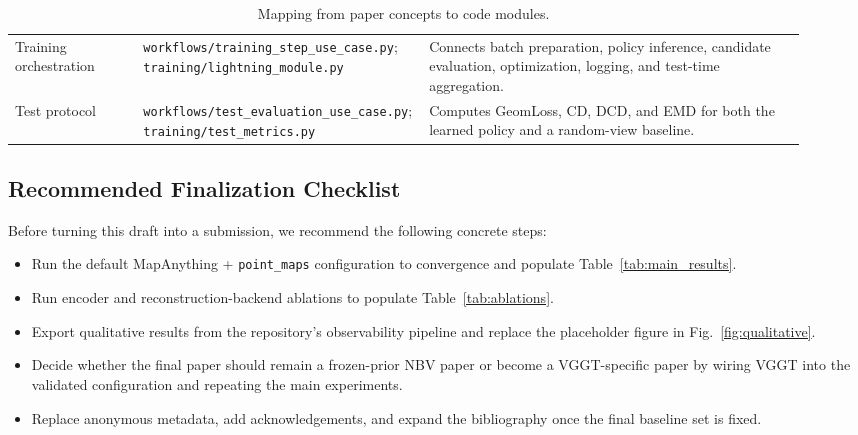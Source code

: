 \begin{table}[h]
\begin{tabular}{>{\raggedright\arraybackslash}p{0.16\linewidth} >{\raggedright\arraybackslash}p{0.29\linewidth} >{\raggedright\arraybackslash}p{0.47\linewidth}}
        Training orchestration & \texttt{workflows/training\_step\_use\_case.py}; \texttt{training/lightning\_module.py} & Connects batch preparation, policy inference, candidate evaluation, optimization, logging, and test-time aggregation. \\
        Test protocol & \texttt{workflows/test\_evaluation\_use\_case.py}; \texttt{training/test\_metrics.py} & Computes GeomLoss, CD, DCD, and EMD for both the learned policy and a random-view baseline. \\
        \bottomrule
    \end{tabular}
    \caption{Mapping from paper concepts to code modules.}
    \label{tab:repo_mapping}
\end{table}

\subsection{Recommended Finalization Checklist}
\label{sec:checklist}

Before turning this draft into a submission, we recommend the following concrete steps:
\begin{itemize}
    \item Run the default MapAnything + \texttt{point\_maps} configuration to convergence and populate Table~\ref{tab:main_results}.
    \item Run encoder and reconstruction-backend ablations to populate Table~\ref{tab:ablations}.
    \item Export qualitative results from the repository's observability pipeline and replace the placeholder figure in Fig.~\ref{fig:qualitative}.
    \item Decide whether the final paper should remain a frozen-prior NBV paper or become a VGGT-specific paper by wiring VGGT into the validated configuration and repeating the main experiments.
    \item Replace anonymous metadata, add acknowledgements, and expand the bibliography once the final baseline set is fixed.
\end{itemize}
